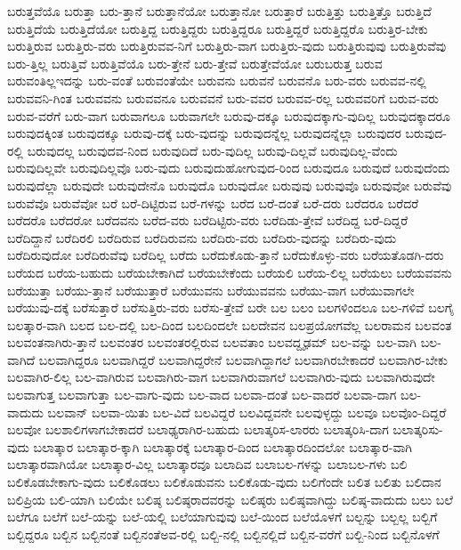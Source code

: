 {ಬರುತ್ತವೆಯೊ
ಬರುತ್ತಾ
ಬರು-ತ್ತಾನೆ
ಬರುತ್ತಾನೆಯೋ
ಬರುತ್ತಾನೋ
ಬರುತ್ತಾರೆ
ಬರುತ್ತಿತ್ತು
ಬರುತ್ತಿತ್ತೊ
ಬರುತ್ತಿದೆ
ಬರುತ್ತಿದೆಯೆ
ಬರುತ್ತಿದೆಯೋ
ಬರುತ್ತಿದ್ದ
ಬರುತ್ತಿದ್ದರು
ಬರುತ್ತಿದ್ದರೂ
ಬರುತ್ತಿದ್ದರೆ
ಬರುತ್ತಿದ್ದರೊ
ಬರುತ್ತಿರ-ಬೇಕು
ಬರುತ್ತಿರುವ
ಬರುತ್ತಿರು-ವರು
ಬರುತ್ತಿರುವವ-ನಿಗೆ
ಬರುತ್ತಿರು-ವಾಗ
ಬರುತ್ತಿರು-ವುದು
ಬರುತ್ತಿರುವುವು
ಬರುತ್ತಿರುವೆವು
ಬರು-ತ್ತಿಲ್ಲ
ಬರುತ್ತಿವೆ
ಬರುತ್ತಿವೆಯೊ
ಬರು-ತ್ತೇನೆ
ಬರು-ತ್ತೇವೆ
ಬರುತ್ತೇವೆಯೋ
ಬರುಬರುತ್ತ
ಬರುವ
ಬರುವಂತಿಲ್ಲಇದನ್ನು
ಬರು-ವಂತೆ
ಬರುವಂತೆಯೇ
ಬರುವನು
ಬರುವನೆ
ಬರುವನೊ
ಬರು-ವರು
ಬರುವವ-ನಲ್ಲಿ
ಬರುವವನಿ-ಗಿಂತ
ಬರುವವನು
ಬರುವವನೂ
ಬರುವವನೆ
ಬರು-ವವರ
ಬರುವವ-ರಲ್ಲ
ಬರುವವರಿಗೆ
ಬರುವ-ವರು
ಬರುವ-ವರೆಗೆ
ಬರು-ವಾಗ
ಬರುವಾಗಲೂ
ಬರುವಾಗಲೇ
ಬರುವು-ದಕ್ಕೂ
ಬರುವುದಕ್ಕಾಗು-ವುದಿಲ್ಲ
ಬರುವುದಕ್ಕಾದರೂ
ಬರುವುದಕ್ಕಿಂತ
ಬರುವುದಕ್ಕೂ
ಬರುವು-ದಕ್ಕೆ
ಬರು-ವುದನ್ನು
ಬರುವುದನ್ನೆಲ್ಲ
ಬರುವುದನ್ನೆಲ್ಲಾ
ಬರುವುದರ
ಬರುವುದ-ರಲ್ಲಿ
ಬರುವುದಲ್ಲ
ಬರುವುದವ-ನಿಂದ
ಬರುವುದಿದೆ
ಬರು-ವುದಿಲ್ಲ
ಬರುವು-ದಿಲ್ಲವೆ
ಬರುವುದಿಲ್ಲ-ವೆಂದು
ಬರುವುದಿಲ್ಲವೇ
ಬರುವುದಿಲ್ಲವೊ
ಬರು-ವುದು
ಬರುವುದುಹೋಗುವುದ-ರಿಂದ
ಬರುವುದೂ
ಬರುವುದೆ
ಬರುವುದೆಂದು
ಬರುವುದೆಲ್ಲಾ
ಬರುವುದೇ
ಬರುವುದೇನೊ
ಬರುವುದೊ
ಬರುವುದೋ
ಬರುವುವು
ಬರುವುವೊ
ಬರುವುವೋ
ಬರುವೆವು
ಬರುವೆವೊ
ಬರುವೆವೋ
ಬರೆ
ಬರೆ-ದಿಟ್ಟಿರುವ
ಬರೆ-ಗಳನ್ನು
ಬರೆದ
ಬರೆ-ದಂತೆ
ಬರೆ-ದರು
ಬರೆದರೂ
ಬರೆದರೆ
ಬರೆದರೊ
ಬರೆದರೋ
ಬರೆದವನು
ಬರೆದ-ವರು
ಬರೆದಿಟ್ಟಿರು-ವರು
ಬರೆದಿಡು-ತ್ತೇವೆ
ಬರೆದಿದ್ದ
ಬರೆ-ದಿದ್ದರೆ
ಬರೆದಿದ್ದಾನೆ
ಬರೆದಿರಲಿ
ಬರೆದಿರುವ
ಬರೆದಿರುವನು
ಬರೆದಿರು-ವರು
ಬರೆದಿರು-ವುದನ್ನು
ಬರೆದಿರು-ವುದು
ಬರೆದಿರುವುದೋ
ಬರೆದಿರುವೆವು
ಬರೆದಿಲ್ಲ
ಬರೆದು
ಬರೆದುಕೊಡು-ತ್ತಾನೆ
ಬರೆದುಕೊಳ್ಳು-ವರು
ಬರೆಯತೊಡಗಿ-ದರು
ಬರೆಯದ
ಬರೆಯ-ಬಹುದು
ಬರೆಯಬೇಕಾಗಿದೆ
ಬರೆಯಬೇಕೆಂದು
ಬರೆಯಲಿ
ಬರೆಯ-ಲಿಲ್ಲ
ಬರೆಯಲು
ಬರೆಯವವನು
ಬರೆಯುತ್ತಾ
ಬರೆಯು-ತ್ತಾನೆ
ಬರೆಯುತ್ತಾರೆ
ಬರೆಯುವನು
ಬರೆಯುವವನು
ಬರೆಯು-ವಾಗ
ಬರೆಯುವಾಗಲೇ
ಬರೆಯುವು-ದಕ್ಕೆ
ಬರೆಸುತ್ತಾರೆ
ಬರೆಸುತ್ತಿರು-ವರು
ಬರೆಸು-ತ್ತೇವೆ
ಬರೇ
ಬಲ
ಬಲಂ
ಬಲಗಳಿಂದಲೂ
ಬಲ-ಗಳಿವೆ
ಬಲಗೈ
ಬಲತ್ಕಾರ-ವಾಗಿ
ಬಲದ
ಬಲ-ದಲ್ಲಿ
ಬಲ-ದಿಂದ
ಬಲದಿಂದಲೇ
ಬಲದೇವನ
ಬಲಪ್ರಯೋಗವೆಲ್ಲ
ಬಲರಾಮನ
ಬಲವಂತ
ಬಲವಂತನಾಗಿರು-ತ್ತಾನೆ
ಬಲವಂತರ
ಬಲವಂತರಲ್ಲಿರುವ
ಬಲವತಾಂ
ಬಲವದ್ದೃಢಮ್
ಬಲ-ವನ್ನು
ಬಲ-ವಾಗಿ
ಬಲ-ವಾಗಿದೆ
ಬಲವಾಗಿದ್ದರೂ
ಬಲವಾಗಿದ್ದರೆ
ಬಲವಾಗಿದ್ದರೇನೆ
ಬಲವಾಗಿದ್ದಾಗಲೆ
ಬಲವಾಗಿರಬೇಕಾದರೆ
ಬಲವಾಗಿರ-ಬೇಕು
ಬಲವಾಗಿರ-ಲಿಲ್ಲ
ಬಲ-ವಾಗಿರುವ
ಬಲವಾಗಿರು-ವಾಗ
ಬಲವಾಗಿರುವಾಗಲೆ
ಬಲವಾಗಿರು-ವುದು
ಬಲವಾಗಿರುವುದೇ
ಬಲವಾಗುತ್ತ
ಬಲವಾಗುತ್ತಾ
ಬಲ-ವಾಗು-ವುದು
ಬಲ-ವಾದ
ಬಲವಾ-ದಂತೆ
ಬಲ-ವಾದರೆ
ಬಲವಾ-ದಾಗ
ಬಲ-ವಾದುದು
ಬಲವಾನ್
ಬಲವಾ-ಯಿತು
ಬಲ-ವಿದೆ
ಬಲವಿದ್ದರೆ
ಬಲವಿದ್ದವನೇ
ಬಲವುಳ್ಳದ್ದು
ಬಲವೂ
ಬಲವೊಂ-ದಿದ್ದರೆ
ಬಲವೋ
ಬಲಶಾಲಿಗಳಾಗಬೇಕಾದರೆ
ಬಲಾಢ್ಯರಾಗಿರ-ಬಹುದು
ಬಲಾತ್ಕರಿಸ-ಲಾರರು
ಬಲಾತ್ಕರಿಸಿ-ದಾಗ
ಬಲಾತ್ಕರಿಸು-ವುದು
ಬಲಾತ್ಕಾರ
ಬಲಾತ್ಕಾರ-ಕ್ಕಾಗಿ
ಬಲಾತ್ಕಾರಕ್ಕೆ
ಬಲಾತ್ಕಾರ-ದಿಂದ
ಬಲಾತ್ಕಾರದಿಂದಲೋ
ಬಲಾತ್ಕಾರ-ವಾಗಿ
ಬಲಾತ್ಕಾರವಾಗಿಯೋ
ಬಲಾತ್ಕಾರ-ವಿಲ್ಲ
ಬಲಾತ್ಕಾರವೂ
ಬಲಾದಿವ
ಬಲಾಬಲ-ಗಳನ್ನು
ಬಲಾಬಲ-ಗಳು
ಬಲಿ
ಬಲಿಕೊಡಬೇಕಾಗು-ವುದು
ಬಲಿಕೊಡಲು
ಬಲಿಕೊಡುವನು
ಬಲಿಕೊಡು-ವುದು
ಬಲಿಗೆಂದೇ
ಬಲಿತ
ಬಲಿತು
ಬಲಿದಾನ
ಬಲಿಪ್ರಿಯ
ಬಲಿ-ಯಾಗಿ
ಬಲಿಯೇ
ಬಲಿಷ್ಠ
ಬಲಿಷ್ಠರಾದವರನ್ನು
ಬಲಿಷ್ಠರು
ಬಲಿಷ್ಠವಾಗಿದ್ದು
ಬಲಿಷ್ಠ-ವಾದುದು
ಬಲು
ಬಲೆ
ಬಲೆಗೂ
ಬಲೆಗೆ
ಬಲೆ-ಯನ್ನು
ಬಲೆ-ಯಲ್ಲಿ
ಬಲೆಯಾಗುವುವು
ಬಲೆ-ಯಿಂದ
ಬಲೆಯೊಳಗೆ
ಬಲ್ಬನ್ನು
ಬಲ್ಬಲ್ಲ
ಬಲ್ಬಿಗೆ
ಬಲ್ಬಿದ್ದರೂ
ಬಲ್ಬಿನ
ಬಲ್ಬಿನಂತೆ
ಬಲ್ಬಿನಂತೆಅವ-ರಲ್ಲಿ
ಬಲ್ಬಿ-ನಲ್ಲಿ
ಬಲ್ಬಿನಲ್ಲಿದೆ
ಬಲ್ಬಿನ-ವರೆಗೆ
ಬಲ್ಬಿ-ನಿಂದ
ಬಲ್ಬಿನೊಳಗೆ
}
